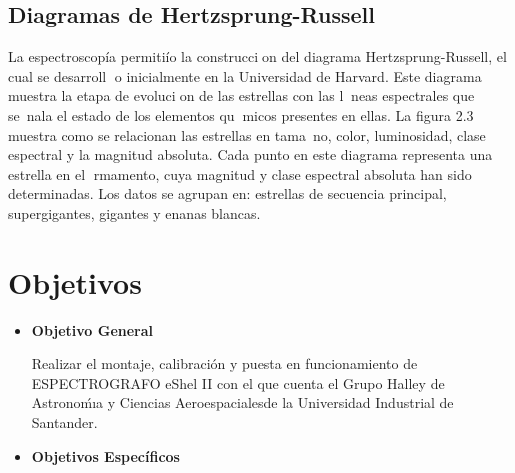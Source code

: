 \documentclass[11pt]{article}
\begin{document}



\subsection {Diagramas de Hertzsprung-Russell}



La espectroscopía permitiío la construccion del diagrama Hertzsprung-Russell, el cual se desarroll
o inicialmente en la Universidad de Harvard.
Este diagrama muestra la etapa de evolucion
de las estrellas con las lneas espectrales que se~nala el estado de los elementos qumicos presentes
en ellas. La figura 2.3 muestra como se relacionan las estrellas en tama~no, color, luminosidad,
clase espectral y la magnitud absoluta. Cada punto en este diagrama representa una
estrella en el rmamento, cuya magnitud y clase espectral absoluta han sido determinadas.
Los datos se agrupan en: estrellas de secuencia principal, supergigantes, gigantes y enanas
blancas.













\section{Objetivos}


\begin{itemize}
\item \textbf{Objetivo General}

Realizar el montaje, calibración y puesta en funcionamiento de ESPECTROGRAFO eShel II con el que cuenta el Grupo Halley de Astronoḿıa y Ciencias Aeroespacialesde la Universidad Industrial de Santander.\\

\item \textbf{Objetivos Espec\'ificos}
\end{itemize}
\end{document}
